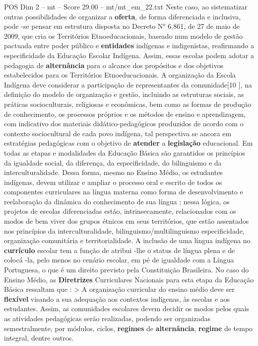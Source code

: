 \begin{textsample}{POS Dim 2 – mt – Score 29.00 – mt/mt\_em\_22.txt}
Neste caso, ao sistematizar outras possibilidades de organizar a \textbf{oferta}, de forma diferenciada e inclusiva, pode -se pensar em estrutura disposta no Decreto N{\EmojiFont °} 6.861, de 27 de maio de 2009, que cria os Territórios Etnoeducacionais, baseado num modelo de gestão pactuada entre poder público e \textbf{entidades} indígenas e indigenistas, reafirmando a especificidade da Educação Escolar Indígena.
Assim, essas escolas podem adotar a pedagogia de \textbf{alternância} para o alcance dos propósitos e dos objetivos estabelecidos para os Territórios Etnoeducacionais.
A organização da Escola Indígena deve considerar a participação de representantes da comunidade[10 ], na definição do modelo de organização e gestão, incluindo as estruturas sociais, as práticas socioculturais, religiosas e econômicas, bem como as formas de produção de conhecimento, os processos próprios e os métodos de ensino e aprendizagem, com indicativo dos materiais didático-pedagógicos produzidos de acordo com o contexto sociocultural de cada povo indígena, tal perspectiva se ancora em estratégias pedagógicas com o objetivo de \textbf{atender} a \textbf{legislação} educacional.
Em todas as etapas e modalidades da Educação Básica são garantidos os princípios da igualdade social, da diferença, da especificidade, do bilinguismo e da interculturalidade.
Dessa forma, mesmo no Ensino Médio, os estudantes indígenas, devem utilizar e ampliar o processo oral e escrito de todos os componentes curriculares na língua materna como forma de desenvolvimento e reelaboração da dinâmica do conhecimento de sua língua ; nessa lógica, os projetos de escolas diferenciadas estão, intrinsecamente, relacionados com os modos de bem viver dos grupos étnicos em seus territórios, que estão assentados nos princípios da interculturalidade, bilinguismo/multilinguismo especificidade, organização comunitária e territorialidade.
A inclusão de uma língua indígena no \textbf{currículo} escolar tem a função de atribui -lhe o status de língua plena e de colocá -la, pelo menos no cenário escolar, em pé de igualdade com a Língua Portuguesa, o que é um direito previsto pela Constituição Brasileira.
No caso do Ensino Médio, as \textbf{Diretrizes} Curriculares Nacionais para esta etapa da Educação Básica ressaltam que : > A organização curricular do ensino médio deve ser \textbf{flexível} visando a sua adequação aos contextos indígenas, às escolas e aos estudantes.
Assim, as comunidades escolares devem decidir os modos pelos quais as atividades pedagógicas serão realizadas, podendo ser organizadas semestralmente, por módulos, ciclos, \textbf{regimes} de \textbf{alternância}, \textbf{regime} de tempo integral, dentre outros.

\end{textsample}
